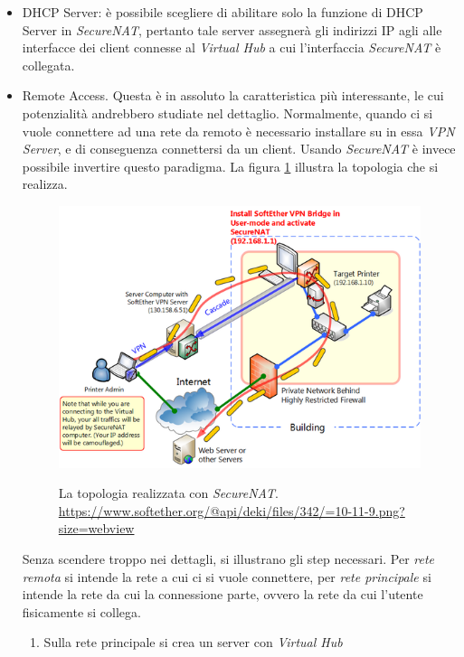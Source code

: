 \begin{description}
\begin{itemize}
    \item DHCP Server: è possibile scegliere di abilitare solo la funzione di DHCP Server in \textit{SecureNAT}, pertanto
    tale server assegnerà gli indirizzi IP agli alle interfacce dei client connesse al \textit{Virtual Hub} a cui
    l'interfaccia \textit{SecureNAT} è collegata.
    \item Remote Access. Questa è in assoluto la caratteristica più interessante, le cui potenzialità andrebbero studiate
    nel dettaglio. Normalmente, quando ci si vuole connettere ad una rete da remoto è
    necessario installare su in essa \textit{VPN Server}, e di conseguenza connettersi da un client. Usando \textit{SecureNAT}
    è invece possibile invertire questo paradigma. La figura \ref{fig:securenat} illustra la topologia che si realizza.\\
    \begin{figure}
      \includegraphics[scale=0.55]{img/softether_securenat}
      \label{fig:securenat}
      \caption[La topologia realizzata con \textit{SecureNAT}]{
        La topologia realizzata con \textit{SecureNAT}.
        \url{https://www.softether.org/@api/deki/files/342/=10-11-9.png?size=webview}}
    \end{figure}
    Senza scendere troppo nei dettagli, si illustrano gli step necessari. Per \textit{rete remota} si intende la rete a cui
    ci si vuole connettere, per \textit{rete principale} si intende la rete da cui la connessione parte, ovvero
    la rete da cui l'utente fisicamente si collega.
    \begin{enumerate}
      \item Sulla rete principale si crea un server con \textit{Virtual Hub}

\end{enumerate}
\end{itemize}
\end{description}
